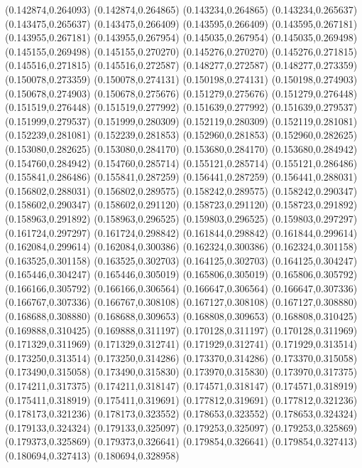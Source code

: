 (0.142874,0.264093)
(0.142874,0.264865)
(0.143234,0.264865)
(0.143234,0.265637)
(0.143475,0.265637)
(0.143475,0.266409)
(0.143595,0.266409)
(0.143595,0.267181)
(0.143955,0.267181)
(0.143955,0.267954)
(0.145035,0.267954)
(0.145035,0.269498)
(0.145155,0.269498)
(0.145155,0.270270)
(0.145276,0.270270)
(0.145276,0.271815)
(0.145516,0.271815)
(0.145516,0.272587)
(0.148277,0.272587)
(0.148277,0.273359)
(0.150078,0.273359)
(0.150078,0.274131)
(0.150198,0.274131)
(0.150198,0.274903)
(0.150678,0.274903)
(0.150678,0.275676)
(0.151279,0.275676)
(0.151279,0.276448)
(0.151519,0.276448)
(0.151519,0.277992)
(0.151639,0.277992)
(0.151639,0.279537)
(0.151999,0.279537)
(0.151999,0.280309)
(0.152119,0.280309)
(0.152119,0.281081)
(0.152239,0.281081)
(0.152239,0.281853)
(0.152960,0.281853)
(0.152960,0.282625)
(0.153080,0.282625)
(0.153080,0.284170)
(0.153680,0.284170)
(0.153680,0.284942)
(0.154760,0.284942)
(0.154760,0.285714)
(0.155121,0.285714)
(0.155121,0.286486)
(0.155841,0.286486)
(0.155841,0.287259)
(0.156441,0.287259)
(0.156441,0.288031)
(0.156802,0.288031)
(0.156802,0.289575)
(0.158242,0.289575)
(0.158242,0.290347)
(0.158602,0.290347)
(0.158602,0.291120)
(0.158723,0.291120)
(0.158723,0.291892)
(0.158963,0.291892)
(0.158963,0.296525)
(0.159803,0.296525)
(0.159803,0.297297)
(0.161724,0.297297)
(0.161724,0.298842)
(0.161844,0.298842)
(0.161844,0.299614)
(0.162084,0.299614)
(0.162084,0.300386)
(0.162324,0.300386)
(0.162324,0.301158)
(0.163525,0.301158)
(0.163525,0.302703)
(0.164125,0.302703)
(0.164125,0.304247)
(0.165446,0.304247)
(0.165446,0.305019)
(0.165806,0.305019)
(0.165806,0.305792)
(0.166166,0.305792)
(0.166166,0.306564)
(0.166647,0.306564)
(0.166647,0.307336)
(0.166767,0.307336)
(0.166767,0.308108)
(0.167127,0.308108)
(0.167127,0.308880)
(0.168688,0.308880)
(0.168688,0.309653)
(0.168808,0.309653)
(0.168808,0.310425)
(0.169888,0.310425)
(0.169888,0.311197)
(0.170128,0.311197)
(0.170128,0.311969)
(0.171329,0.311969)
(0.171329,0.312741)
(0.171929,0.312741)
(0.171929,0.313514)
(0.173250,0.313514)
(0.173250,0.314286)
(0.173370,0.314286)
(0.173370,0.315058)
(0.173490,0.315058)
(0.173490,0.315830)
(0.173970,0.315830)
(0.173970,0.317375)
(0.174211,0.317375)
(0.174211,0.318147)
(0.174571,0.318147)
(0.174571,0.318919)
(0.175411,0.318919)
(0.175411,0.319691)
(0.177812,0.319691)
(0.177812,0.321236)
(0.178173,0.321236)
(0.178173,0.323552)
(0.178653,0.323552)
(0.178653,0.324324)
(0.179133,0.324324)
(0.179133,0.325097)
(0.179253,0.325097)
(0.179253,0.325869)
(0.179373,0.325869)
(0.179373,0.326641)
(0.179854,0.326641)
(0.179854,0.327413)
(0.180694,0.327413)
(0.180694,0.328958)
